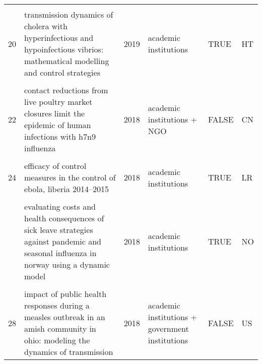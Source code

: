 \documentclass[
]{article}
\begin{document}
\begin{landscape}
\begin{longtable}{l>{\raggedright\arraybackslash}p{4cm}l>{\raggedright\arraybackslash}p{3.5cm}l>{\raggedright\arraybackslash}p{1.5cm}}
\cellcolor{gray!6}{19} & \cellcolor{gray!6}{study on modeling simulation and optimal control method for the transmission risk of the ebola virus} & \cellcolor{gray!6}{2019} & \cellcolor{gray!6}{academic institutions} & \cellcolor{gray!6}{TRUE} & \cellcolor{gray!6}{west africa}\\
20 & transmission dynamics of cholera with hyperinfectious and hypoinfectious vibrios: mathematical modelling and control strategies & 2019 & academic institutions & TRUE & HT\\
\addlinespace
\cellcolor{gray!6}{21} & \cellcolor{gray!6}{a new epidemics–logistics model: insights into controlling the ebola virus disease in west africa} & \cellcolor{gray!6}{2018} & \cellcolor{gray!6}{academic institutions} & \cellcolor{gray!6}{TRUE} & \cellcolor{gray!6}{GN LR SL}\\
22 & contact reductions from live poultry market closures limit the epidemic of human infections with h7n9 influenza & 2018 & academic institutions + NGO & FALSE & CN\\
\cellcolor{gray!6}{23} & \cellcolor{gray!6}{disparities in spread and control of influenza in slums of delhi: findings from an agent-based modelling study} & \cellcolor{gray!6}{2018} & \cellcolor{gray!6}{academic institutions} & \cellcolor{gray!6}{TRUE} & \cellcolor{gray!6}{IN}\\
24 & efficacy of control measures in the control of ebola, liberia 2014–2015 & 2018 & academic institutions & TRUE & LR\\
\cellcolor{gray!6}{25} & \cellcolor{gray!6}{epidemiology of the silent polio outbreak in rahat, israel, based on modeling of environmental surveillance data} & \cellcolor{gray!6}{2018} & \cellcolor{gray!6}{academic institutions + government institutions + NGO} & \cellcolor{gray!6}{FALSE} & \cellcolor{gray!6}{IL}\\
\addlinespace
26 & evaluating costs and health consequences of sick leave strategies against pandemic and seasonal influenza in norway using a dynamic model & 2018 & academic institutions & TRUE & NO\\
\cellcolor{gray!6}{27} & \cellcolor{gray!6}{evaluating vaccination strategies to control foot-and-mouth disease: a country comparison study} & \cellcolor{gray!6}{2018} & \cellcolor{gray!6}{academic institutions + government institutions + NGO} & \cellcolor{gray!6}{FALSE} & \cellcolor{gray!6}{AU CA NZ GB US}\\
28 & impact of public health responses during a measles outbreak in an amish community in ohio: modeling the dynamics of transmission & 2018 & academic institutions + government institutions & FALSE & US\\

\end{longtable}
\end{landscape}
\end{document}
